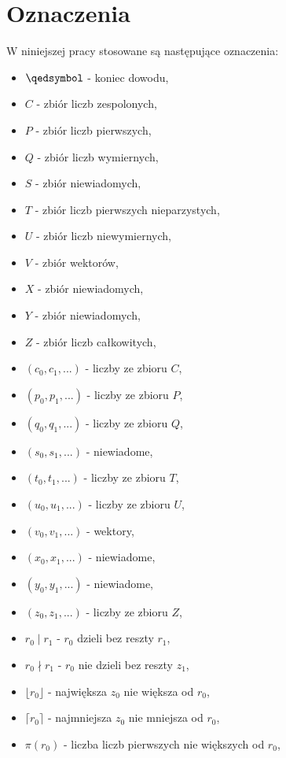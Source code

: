 \chapter*{Oznaczenia}
W niniejszej pracy stosowane są następujące oznaczenia:
\\
\begin{itemize}[nosep, leftmargin=*]
\item $\qedsymbol$ - koniec dowodu, 
\item $C$ - zbiór liczb zespolonych,
\item $P$ - zbiór liczb pierwszych,
\item $Q$ - zbiór liczb wymiernych,
\item $S$ - zbiór niewiadomych,
\item $T$ - zbiór liczb pierwszych nieparzystych,
\item $U$ - zbiór liczb niewymiernych,
\item $V$ - zbiór wektorów,
\item $X$ - zbiór niewiadomych,
\item $Y$ - zbiór niewiadomych,
\item $Z$ - zbiór liczb całkowitych,
\item $(c_0, c_1, ...)$ - liczby ze zbioru $C$,
\item $(p_0, p_1, ...)$ - liczby ze zbioru $P$,
\item $(q_0, q_1, ...)$ - liczby ze zbioru $Q$,
\item $(s_0, s_1, ...)$ - niewiadome,
\item $(t_0, t_1, ...)$ - liczby ze zbioru $T$,
\item $(u_0, u_1, ...)$ - liczby ze zbioru $U$,
\item $(v_0, v_1, ...)$ - wektory,
\item $(x_0, x_1, ...)$ - niewiadome,
\item $(y_0, y_1, ...)$ - niewiadome,
\item $(z_0, z_1, ...)$ - liczby ze zbioru $Z$,
\item $r_0 \mid r_1$ - $r_0$ dzieli bez reszty $r_1$,
\item $r_0 \nmid r_1$ - $r_0$ nie dzieli bez reszty $z_1$,
\item $\lfloor r_0 \rfloor$ - największa $z_0$ nie większa od $r_0$,
\item $\lceil r_0 \rceil$ - najmniejsza $z_0$ nie mniejsza od $r_0$,
\item $\pi(r_0)$ - liczba liczb pierwszych nie większych od $r_0$,

\end{itemize}
